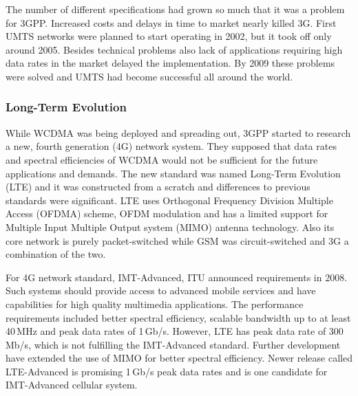The number of different specifications had grown so much that it was a problem for 3GPP. Increased costs and delays in time to market nearly killed 3G. First UMTS networks were planned to start operating in 2002, but it took off only around 2005. Besides technical problems also lack of applications requiring high data rates in the market delayed the implementation. By 2009 these problems were solved and UMTS had become successful all around the world. \cite{molisch}

\subsubsection{Long-Term Evolution}
\label{sec:lte}
While WCDMA was being deployed and spreading out, 3GPP started to research a new, fourth generation (4G) network system. They supposed that data rates and spectral efficiencies of WCDMA would not be sufficient for the future applications and demands. The new standard was named Long-Term Evolution (LTE) and it was constructed from a scratch and differences to previous standards were significant. LTE uses Orthogonal Frequency Division Multiple Access (OFDMA) scheme, OFDM modulation and has a limited support for Multiple Input Multiple Output system (MIMO) antenna technology. Also its core network is purely packet-switched while GSM was circuit-switched and 3G a combination of the two. \cite{molisch}

For 4G network standard, IMT-Advanced, ITU announced requirements in 2008. Such systems should provide access to advanced mobile services and have capabilities for high quality multimedia applications. The performance requirements included better spectral efficiency, scalable bandwidth up to at least 40\,MHz and peak data rates of 1\,Gb/s. \cite{itur} However, LTE has peak data rate of 300\,Mb/s, which is not fulfilling the IMT-Advanced standard. Further development have extended the use of MIMO for better spectral efficiency. Newer release called LTE-Advanced is promising 1\,Gb/s peak data rates and is one candidate for IMT-Advanced cellular system. \cite{molisch} %


